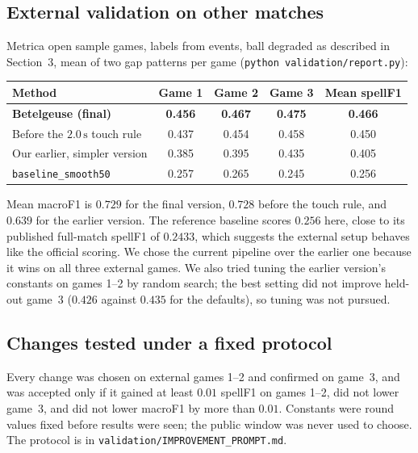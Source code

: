 \documentclass[11pt,a4paper]{article}
\newcommand{\code}[1]{\texttt{#1}}
\begin{document}
\subsection{External validation on other matches}

Metrica open sample games, labels from events, ball degraded as described in Section~3, mean of
two gap patterns per game (\code{python validation/report.py}):

\begin{center}
\begin{tabular}{@{}lcccc@{}}
\toprule
\textbf{Method} & \textbf{Game 1} & \textbf{Game 2} & \textbf{Game 3} & \textbf{Mean spellF1} \\
\midrule
\textbf{Betelgeuse (final)} & \textbf{0.456} & \textbf{0.467} & \textbf{0.475} & \textbf{0.466} \\
Before the $2.0\,\text{s}$ touch rule & 0.437 & 0.454 & 0.458 & 0.450 \\
Our earlier, simpler version & 0.385 & 0.395 & 0.435 & 0.405 \\
\code{baseline\_smooth50} & 0.257 & 0.265 & 0.245 & 0.256 \\
\bottomrule
\end{tabular}
\end{center}

Mean macroF1 is $0.729$ for the final version, $0.728$ before the touch rule, and $0.639$ for
the earlier version. The reference
baseline scores $0.256$ here, close to its published full-match spellF1 of $0.2433$, which suggests
the external setup behaves like the official scoring. We chose the current pipeline over the
earlier one because it wins on all three external games. We also tried tuning the earlier
version's constants on games 1--2 by random search; the best setting did not improve held-out
game~3 ($0.426$ against $0.435$ for the defaults), so tuning was not pursued.

\subsection{Changes tested under a fixed protocol}

Every change was chosen on external games 1--2 and confirmed on game~3, and was accepted only if it
gained at least $0.01$ spellF1 on games 1--2, did not lower game~3, and did not lower macroF1 by
more than $0.01$. Constants were round values fixed before results were seen; the public window was
never used to choose. The protocol is in \code{validation/IMPROVEMENT\_PROMPT.md}.
\end{document}
